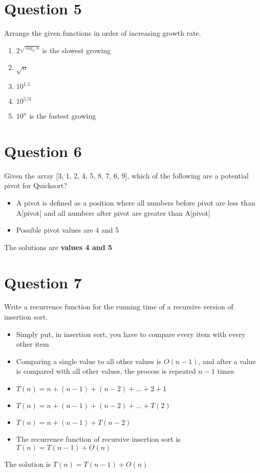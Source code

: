 \documentclass{report}
\begin{document}
    \section{Question 5}
    Arrange the given functions in order of increasing growth rate.
        \begin{enumerate}
            \item{$2^{\sqrt{\log_2 n}}$ is the slowest growing}
            \item{$\sqrt n$}
            \item{$10^{1.5}$}
            \item{$10^{5/3}$}
            \item{$10^n$ is the fastest growing}
        \end{enumerate}

    \section{Question 6}
    Given the array [3, 1, 2, 4, 5, 8, 7, 6, 9], which of the following are a potential pivot for Quicksort?
        \begin{itemize}
            \item{A pivot is defined as a position where all numbers before pivot are less than A[pivot] and all numbers after pivot are greater than A[pivot]}
            \item{Possible pivot values are 4 and 5}
        \end{itemize}
        The solutions are \textbf{values 4 and 5}

    \section{Question 7}
    Write a recurrence function for the running time of a recursive version of insertion sort.
    	\begin{itemize}
    		\item{Simply put, in insertion sort, you have to compare every item with every other item}
    		\item{Comparing a single value to all other values is $O(n - 1)$, and after a value is compared with all other values, the process is repeated $n-1$ times}
    		\item{$T(n) = n + (n - 1) + (n - 2) + ... + 2 + 1$}
    		\item{$T(n) = n + (n - 1) + (n-2) + ... + T(2)$}
    		\item{$T(n) = n + (n - 1) + T(n-2)$}
    		\item{The recurrence function of recursive insertion sort is $T(n) = T(n-1) + O(n)$}
		\end{itemize}
        The solution is $T(n) = T(n-1) + O(n)$
\end{document}
